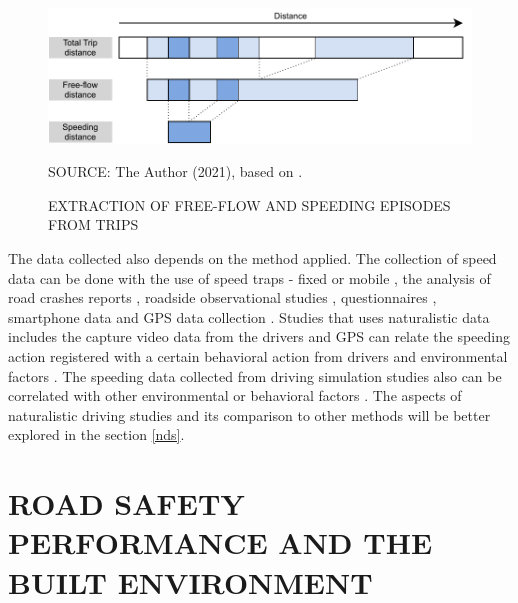 \begin{figure}[!htbp]
    \centering\footnotesize
    \captionsetup{font=footnotesize}
    \caption{EXTRACTION OF FREE-FLOW AND SPEEDING EPISODES FROM TRIPS}
    \includegraphics{fig/richards.pdf}
    \label{fig:ff}
    \par SOURCE: The Author (2021), based on \textcite{Richard2013}.
\end{figure}

The data collected also depends on the method applied. The collection of speed data can be done with the use of speed traps - fixed or mobile \cite{Hidalgo-Solorzano2020, WHO2008}, the analysis of road crashes reports \cite{Watson2015}, roadside observational studies \cite{Shinar2017}, questionnaires \cite{Dinh2013}, smartphone data \cite{Warren2019} and GPS data collection \cite{Moreno2013, Wang2018}. Studies that uses naturalistic data includes the capture video data from the drivers and GPS can relate the speeding action registered with a certain behavioral action from drivers \cite{Bastos2020a} and environmental factors \cite{Moreno2013}. The speeding data collected from driving simulation studies also can be correlated with other environmental or behavioral factors \cite{Yadav2020}. The aspects of naturalistic driving studies and its comparison to other methods will be better explored in the section \ref{nds}. 


 

\section{ROAD SAFETY PERFORMANCE AND THE BUILT ENVIRONMENT} \label{be}





